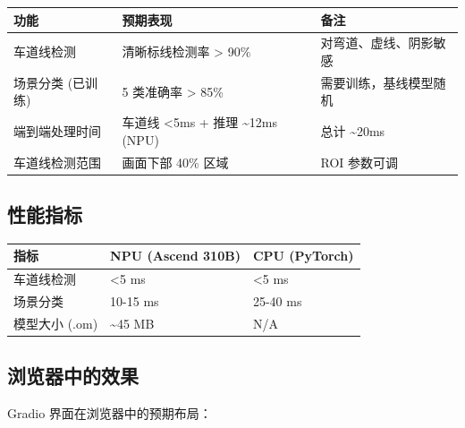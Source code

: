 \begin{longtable}[]{@{}lll@{}}
\toprule\noalign{}
功能 & 预期表现 & 备注 \\
\midrule\noalign{}
\endhead
\bottomrule\noalign{}
\endlastfoot
车道线检测 & 清晰标线检测率 \textgreater{} 90\% &
对弯道、虚线、阴影敏感 \\
场景分类 (已训练) & 5 类准确率 \textgreater{} 85\% &
需要训练，基线模型随机 \\
端到端处理时间 & 车道线 \textless5ms + 推理 \textasciitilde12ms (NPU) &
总计 \textasciitilde20ms \\
车道线检测范围 & 画面下部 40\% 区域 & ROI 参数可调 \\
\end{longtable}

\subsection{性能指标}\label{src-experiment-case6-h32}

\begin{longtable}[]{@{}lll@{}}
\toprule\noalign{}
指标 & NPU (Ascend 310B) & CPU (PyTorch) \\
\midrule\noalign{}
\endhead
\bottomrule\noalign{}
\endlastfoot
车道线检测 & \textless5 ms & \textless5 ms \\
场景分类 & 10-15 ms & 25-40 ms \\
模型大小 (.om) & \textasciitilde45 MB & N/A \\
\end{longtable}

\subsection{浏览器中的效果}\label{src-experiment-case6-h33}

Gradio 界面在浏览器中的预期布局：

